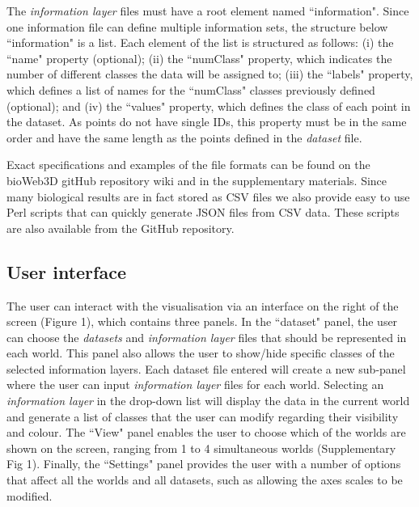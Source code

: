\documentclass[10pt]{bmc_article}
\newenvironment{bmcformat}{\baselineskip20pt\sloppy\setboolean{publ}{false}}{\baselineskip20pt\sloppy}
\begin{document}
\begin{bmcformat}
The {\it{information layer}} files must have a root element named  ``information". Since one information file can define multiple information sets, the structure below ``information" is a list. Each element of the list is structured as follows: (i) the ``name" property (optional); (ii) the ``numClass" property, which indicates the number of different classes the data will be assigned to; (iii) the ``labels" property, which defines a list of names for the ``numClass" classes previously defined (optional); and (iv) the ``values" property, which defines the class of each point in the dataset. As points do not have single IDs, this property must be in the same order and have the same length as the points defined in the {\it{dataset}} file.

Exact specifications and examples of the file formats can be found on the bioWeb3D gitHub repository wiki and in the supplementary materials. Since many biological results are in fact stored as CSV files we also provide easy to use Perl scripts that can quickly generate JSON files from CSV data. These scripts are also available from the GitHub repository.


\begin{figure}[h!]%

\end{figure}

\subsection{User interface}
The user can interact with the visualisation via an interface on the right of the screen (Figure 1), which contains three panels. In the ``dataset" panel, the user can choose the {\it{datasets}} and {\it{information layer}} files that should be represented in each world. This panel also allows the user to show/hide specific classes of the selected information layers. Each dataset file entered will create a new sub-panel where the user can input {\it{information layer}} files for each world. Selecting an {\it{information layer}} in the drop-down list will display the data in the current world and generate a list of classes that the user can modify regarding their visibility and colour. The ``View" panel enables the user to choose which of the worlds are shown on the screen, ranging from 1 to 4 simultaneous worlds (Supplementary Fig 1). Finally, the ``Settings" panel provides the user with a number of options that affect all the worlds and all datasets, such as allowing the axes scales to be modified.



\end{bmcformat}
\end{document}
